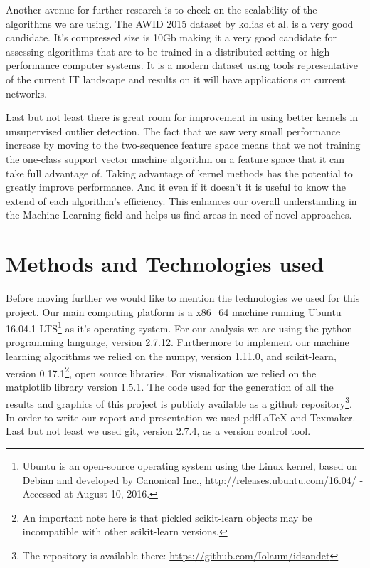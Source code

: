 \documentclass[reqno,openany,12pt]{amsbook}
\begin{document}
Another avenue for further research is to check on the scalability of the algorithms we are using. The AWID 2015 dataset by kolias et al.\cite{adf3} is a very good candidate. It's compressed size is 10Gb making it a very good candidate for assessing algorithms that are to be trained in a distributed setting or high performance computer systems. It is a modern dataset using tools representative of the current IT landscape and results on it will have applications on current networks.

Last but not least there is great room for improvement in using better kernels in unsupervised outlier detection. The fact that we saw very small performance increase by moving to the two-sequence feature space means that we not training the one-class support vector machine algorithm on a feature space that it can take full advantage of. Taking advantage of kernel methods has the potential to greatly improve performance. And it even if it doesn't it is useful to know the extend of each algorithm's efficiency. This enhances our overall understanding in the Machine Learning field and helps us find areas in need of novel approaches.

 


\appendix 

\chapter{Methods and Technologies used}

Before moving further we would like to mention the technologies we used for this project. Our main computing platform is a x86\_{}64 machine running Ubuntu 16.04.1 LTS\footnote{Ubuntu is an open-source operating system using the Linux kernel, based on Debian and developed by Canonical Inc., \url{http://releases.ubuntu.com/16.04/} - Accessed at August 10, 2016.} as it's operating system. For our analysis we are using the python\cite{pyt} programming language, version 2.7.12. Furthermore to implement our machine learning algorithms we relied on the numpy\cite{numpy}, version 1.11.0, and scikit-learn\cite{skl}, version 0.17.1\footnote{An important note here is that pickled scikit-learn objects may be incompatible with other scikit-learn versions.}, open source libraries. For visualization we relied on the matplotlib\cite{matpl} library version 1.5.1. The code used for the generation of all the results and graphics of this project is publicly available as a github repository\footnote{The repository is available there: \url{https://github.com/Iolaum/idsandet}}. In order to write our report and presentation we used pdfLaTeX and Texmaker. Last but not least we used git, version 2.7.4, as a version control tool.
\end{document}
